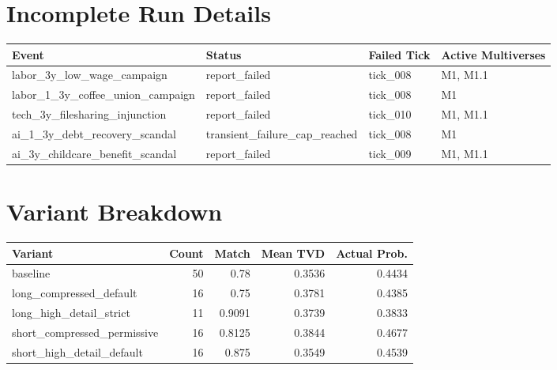 \documentclass[11pt]{article}
\begin{document}
\section*{Incomplete Run Details}
\begin{longtable}{llll}
\toprule
Event & Status & Failed Tick & Active Multiverses \\
\midrule
labor\_3y\_low\_wage\_campaign & report\_failed & tick\_008 & M1, M1.1 \\
labor\_1\_3y\_coffee\_union\_campaign & report\_failed & tick\_008 & M1 \\
tech\_3y\_filesharing\_injunction & report\_failed & tick\_010 & M1, M1.1 \\
ai\_1\_3y\_debt\_recovery\_scandal & transient\_failure\_cap\_reached & tick\_008 & M1 \\
ai\_3y\_childcare\_benefit\_scandal & report\_failed & tick\_009 & M1, M1.1 \\
\bottomrule
\end{longtable}

\section*{Variant Breakdown}
\begin{longtable}{lrrrr}
\toprule
Variant & Count & Match & Mean TVD & Actual Prob. \\
\midrule
baseline & 50 & 0.78 & 0.3536 & 0.4434 \\
long\_compressed\_default & 16 & 0.75 & 0.3781 & 0.4385 \\
long\_high\_detail\_strict & 11 & 0.9091 & 0.3739 & 0.3833 \\
short\_compressed\_permissive & 16 & 0.8125 & 0.3844 & 0.4677 \\
short\_high\_detail\_default & 16 & 0.875 & 0.3549 & 0.4539 \\
\bottomrule
\end{longtable}
\end{document}
